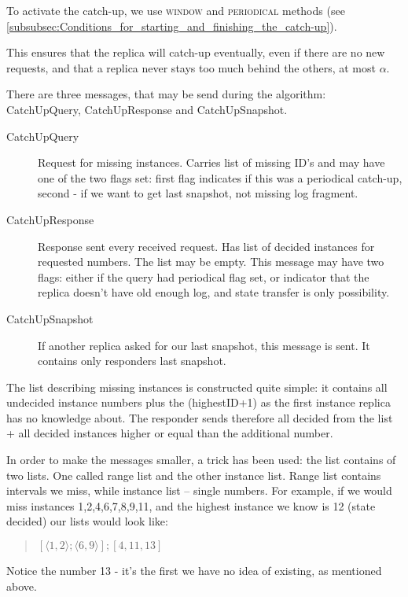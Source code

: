

To activate the catch-up, we use \textsc{window} and \textsc{periodical} methods (see \ref{subsubsec:Conditions_for_starting_and_finishing_the_catch-up}).

This ensures that the replica will catch-up eventually, even if there are no new requests, and that a replica never stays too much behind the others, at most $\alpha$.

There are three messages, that may be send during the algorithm: CatchUpQuery, CatchUpResponse and CatchUpSnapshot.
\begin{description}
 \item[CatchUpQuery] Request for missing instances. Carries list of missing ID's and may have one of the two flags set: first flag indicates if this was a periodical catch-up, second - if we want to get last snapshot, not missing log fragment.
 \item[CatchUpResponse] Response sent every received request. Has list of decided instances for requested numbers. The list may be empty. This message may have two flags: either if the query had periodical flag set, or indicator that the replica doesn't have old enough log, and state transfer is only possibility.
 \item[CatchUpSnapshot] If another replica asked for our last snapshot, this message is sent. It contains only responders last snapshot.
\end{description}

The list describing missing instances is constructed quite simple: it contains all undecided instance numbers plus the (highestID+1) as the first instance replica has no knowledge about. The responder sends therefore all decided from the list + all decided instances higher or equal than the additional number.

In order to make the messages smaller, a trick has been used: the list contains of two lists. One called range list and the other instance list.
Range list contains intervals we miss, while instance list -- single numbers. For example, if we would miss instances 1,2,4,6,7,8,9,11, and the highest instance we know is 12 (state decided) our lists would look like:
\begin{quote}
$[\langle1,2\rangle; \langle6,9\rangle]; [4,11,13]$
\end{quote} 
Notice the number 13 - it's the first we have no idea of existing, as mentioned above.

